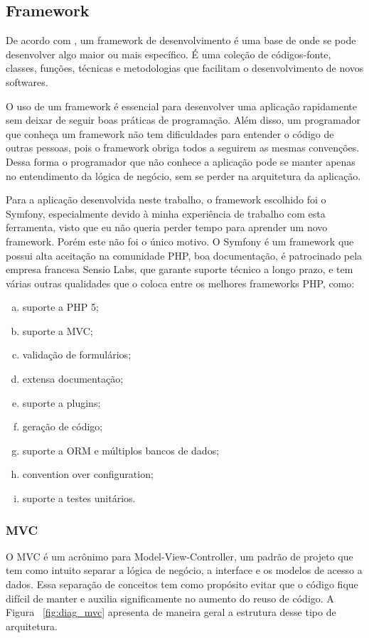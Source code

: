 \subsection{Framework}
De acordo com \cite{Minetto}, um framework de desenvolvimento é uma base de onde se pode desenvolver 
algo maior ou mais específico. É uma coleção de códigos-fonte, classes, funções, técnicas e 
metodologias que facilitam o desenvolvimento de novos softwares.

O uso de um framework é essencial para desenvolver uma aplicação rapidamente sem deixar
de seguir boas práticas de programação. Além disso, um programador que conheça um
framework não tem dificuldades para entender o código de outras pessoas, pois o framework obriga todos 
a seguirem as mesmas convenções. Dessa forma o programador que não conhece a aplicação pode se
manter apenas no entendimento da lógica de negócio, sem se perder na arquitetura da aplicação.

Para a aplicação desenvolvida neste trabalho, o framework escolhido foi o Symfony, especialmente 
devido à minha experiência de trabalho com esta ferramenta, visto que eu não queria perder 
tempo para aprender um novo framework. Porém este não foi o único motivo. O Symfony é um 
framework que possui alta aceitação na comunidade PHP, boa documentação, é patrocinado pela 
empresa francesa Sensio Labs, que garante suporte técnico a longo prazo, e tem várias outras 
qualidades que o coloca entre os melhores frameworks PHP, como:

\begin{enumerate}[a.]
\item suporte a PHP 5;
\item suporte a MVC;
\item validação de formulários;
\item extensa documentação;
\item suporte a plugins;
\item geração de código;
\item suporte a ORM e múltiplos bancos de dados;
\item convention over configuration;
\item suporte a testes unitários.
\end{enumerate}

\subsubsection{MVC}
O MVC é um acrônimo para Model-View-Controller, um padrão de projeto que tem como intuito
separar a lógica de negócio, a interface e os modelos de acesso a dados. Essa separação
de conceitos tem como propósito evitar que o código fique difícil de manter e auxilia
significamente no aumento do reuso de código. A Figura ~\ref{fig:diag_mvc} apresenta de maneira
geral a estrutura desse tipo de arquitetura.

